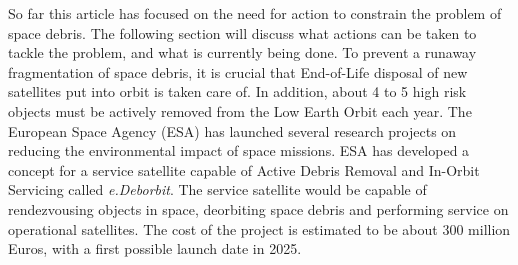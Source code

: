 \documentclass[a4paper]{article}
\begin{document}
So far this article has focused on the need for action to constrain the problem of space debris. The following section will discuss what actions can be taken to tackle the problem, and what is currently being done. To prevent a runaway fragmentation of space debris, it is crucial that End-of-Life disposal of new satellites put into orbit is taken care of. In addition, about 4 to 5 high risk objects must be actively removed from the Low Earth Orbit each year\cite{ESA_about_space_debris}. The European Space Agency (ESA) has launched several research projects on reducing the environmental impact of space missions. ESA has developed a concept for a service satellite capable of Active Debris Removal and In-Orbit Servicing called \textit{e.Deborbit}. The service satellite would be capable of rendezvousing objects in space, deorbiting space debris and performing service on operational satellites. The cost of the project is estimated to be about 300 million Euros, with a first possible launch date in 2025\cite{eDeorbit_cost}.




\end{document}
